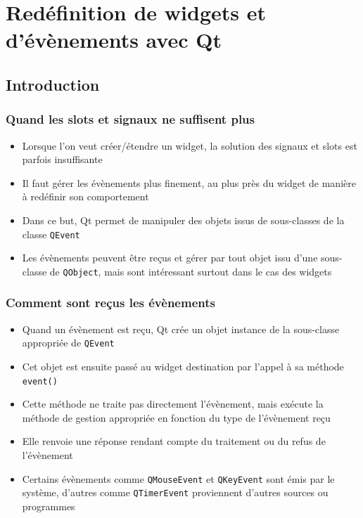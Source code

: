 \documentclass{beamer} %
\begin{document}
\section{Redéfinition de widgets et d'évènements avec Qt}
\subsection{Introduction}

\begin{frame}
	\frametitle{Quand les slots et signaux ne suffisent plus}
	
	\begin{itemize}
	 \item<+-> Lorsque l'on veut créer/étendre un widget, la solution des signaux et slots est parfois insuffisante
	 \item<+-> Il faut gérer les évènements plus finement, au plus près du widget de manière à redéfinir son comportement
	 \item<+-> Dans ce but, Qt permet de manipuler des objets issus de sous-classes de la classe \texttt{QEvent}
	 \item<+-> Les évènements peuvent être reçus et gérer par tout objet issu d'une sous-classe de \texttt{QObject}, mais sont intéressant surtout dans le cas des widgets
	\end{itemize}
\end{frame}

\begin{frame}
	\frametitle{Comment sont reçus les évènements}
	
	\begin{itemize}
	 \item<+-> Quand un évènement est reçu, Qt crée un objet instance de la sous-classe appropriée de \texttt{QEvent}
	 \item<+-> Cet objet est ensuite passé au widget destination par l'appel à sa méthode \texttt{event()}
	 \item<+-> Cette méthode ne traite pas directement l'évènement, mais exécute la méthode de gestion appropriée en fonction du type de l'évènement reçu
	 \item<+-> Elle renvoie une réponse rendant compte du traitement ou du refus de l'évènement
	 \item<+-> Certains évènements comme \texttt{QMouseEvent} et \texttt{QKeyEvent} sont émis par le système, d'autres comme \texttt{QTimerEvent} proviennent d'autres sources ou programmes
	\end{itemize}
\end{frame}
\end{document}
